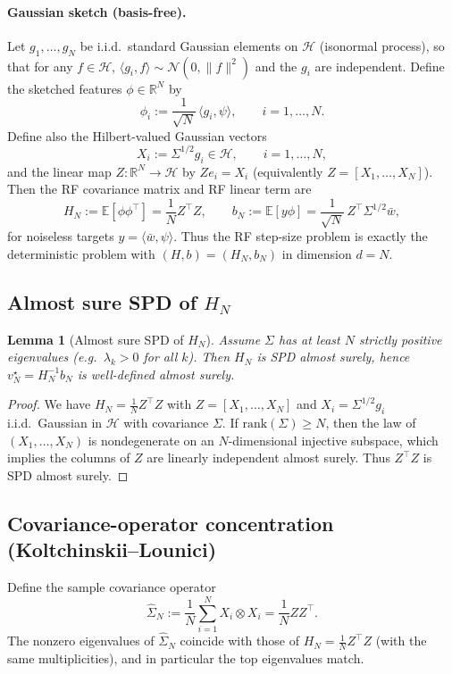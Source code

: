\documentclass[11pt]{article}
\newtheorem{lemma}{Lemma}
\begin{document}
\paragraph{Gaussian sketch (basis-free).}
Let $g_1,\dots,g_N$ be i.i.d.\ standard Gaussian elements on $\mathcal H$ (isonormal process),
so that for any $f\in\mathcal H$, $\langle g_i,f\rangle\sim\mathcal N(0,\|f\|^2)$ and the
$g_i$ are independent. Define the sketched features $\phi\in\mathbb R^N$ by
\[
\phi_i := \frac{1}{\sqrt N}\,\langle g_i,\psi\rangle,\qquad i=1,\dots,N.
\]
Define also the Hilbert-valued Gaussian vectors
\[
X_i := \Sigma^{1/2}g_i\in\mathcal H,\qquad i=1,\dots,N,
\]
and the linear map $Z:\mathbb R^N\to\mathcal H$ by $Z e_i = X_i$ (equivalently $Z=[X_1,\dots,X_N]$).
Then the RF covariance matrix and RF linear term are
\[
H_N:=\mathbb E[\phi\phi^\top]=\frac1N Z^\top Z,
\qquad
b_N:=\mathbb E[y\phi]=\frac{1}{\sqrt N}\,Z^\top \Sigma^{1/2}\bar w,
\]
for noiseless targets $y=\langle \bar w,\psi\rangle$.
Thus the RF step-size problem is exactly the deterministic problem with $(H,b)=(H_N,b_N)$
in dimension $d=N$.

\subsection{Almost sure SPD of $H_N$}

\begin{lemma}[Almost sure SPD of $H_N$]\label{lem:SPD}
Assume $\Sigma$ has at least $N$ strictly positive eigenvalues (e.g.\ $\lambda_k>0$ for all $k$).
Then $H_N$ is SPD almost surely, hence $v_N^\star=H_N^{-1}b_N$ is well-defined almost surely.
\end{lemma}

\begin{proof}
We have $H_N=\frac1N Z^\top Z$ with $Z=[X_1,\dots,X_N]$ and $X_i=\Sigma^{1/2}g_i$ i.i.d.\ Gaussian in $\mathcal H$
with covariance $\Sigma$. If $\mathrm{rank}(\Sigma)\ge N$, then the law of $(X_1,\dots,X_N)$ is nondegenerate on an
$N$-dimensional injective subspace, which implies the columns of $Z$ are linearly independent almost surely.
Thus $Z^\top Z$ is SPD almost surely.
\end{proof}

\subsection{Covariance-operator concentration (Koltchinskii--Lounici)}

Define the sample covariance operator
\[
\widehat\Sigma_N:=\frac1N\sum_{i=1}^N X_i\otimes X_i = \frac1N Z Z^\top.
\]
The nonzero eigenvalues of $\widehat\Sigma_N$ coincide with those of $H_N=\frac1N Z^\top Z$
(with the same multiplicities), and in particular the top eigenvalues match.
\end{document}

